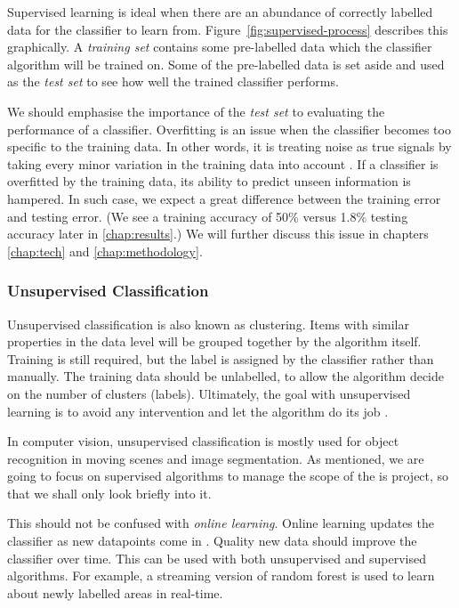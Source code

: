 Supervised learning is ideal when there are an abundance of correctly labelled data for the classifier to learn from. Figure~\ref{fig:supervised-process} describes this graphically. A \textit{training set} contains some pre-labelled data which the classifier algorithm will be trained on. Some of the pre-labelled data is set aside and used as the \textit{test set} to see how well the trained classifier performs. 

We should emphasise the importance of the \textit{test set} to evaluating the performance of a classifier. Overfitting is an issue when the classifier becomes too specific to the training data. In other words, it is treating noise as true signals by taking every minor variation in the training data into account \cite{mur-book}. If a classifier is overfitted by the training data, its ability to predict unseen information is hampered. In such case, we expect a great difference between the training error and testing error. (We see a training accuracy of 50\% versus 1.8\% testing accuracy later in \autoref{chap:results}.) We will further discuss this issue in chapters \ref{chap:tech} and \ref{chap:methodology}. 


\subsubsection{Unsupervised Classification} \label{sssec:unsupervised_overview}
Unsupervised classification is also known as clustering. Items with similar properties in the data level will be grouped together by the algorithm itself. Training is still required, but the label is assigned by the classifier rather than manually. The training data should be unlabelled, to allow the algorithm decide on the number of clusters (labels). Ultimately, the goal with unsupervised learning is to avoid any intervention and let the algorithm do its job \cite{hall-notes}. 

In computer vision, unsupervised classification is mostly used for object recognition in moving scenes and image segmentation. As mentioned, we are going to focus on supervised algorithms to manage the scope of the is project, so that we shall only look briefly into it. 

This should not be confused with \textit{online learning}. Online learning updates the classifier as new datapoints come in \cite{mur-book}. Quality new data should improve the classifier over time. This can be used with both unsupervised and supervised algorithms. For example, a streaming version of random forest is used to learn about newly labelled areas in real-time.


